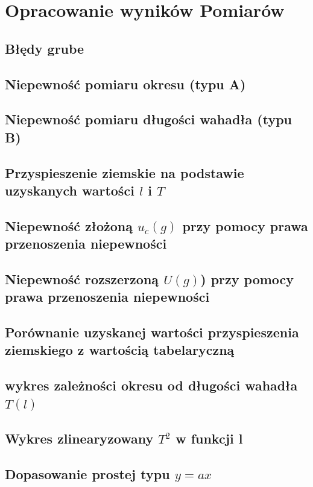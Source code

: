 \documentclass[18pt, twoside]{article}
\begin{document}
 
 
 
\section{Opracowanie wyników Pomiarów}
\subsection{Błędy grube}
\subsection{Niepewność pomiaru okresu (typu A)}
 \subsection{Niepewność pomiaru długości wahadła (typu B)}
 \subsection{Przyspieszenie ziemskie  na podstawie uzyskanych wartości \(l\) i \(T\)}
 \subsection{Niepewność złożoną \(u_c(g)\) przy pomocy prawa przenoszenia niepewności}
 \subsection{Niepewność rozszerzoną \(U(g)\)) przy pomocy prawa przenoszenia niepewności}
 \subsection{Porównanie uzyskanej wartości przyspieszenia ziemskiego z wartością tabelaryczną}
 \subsection{wykres zależności okresu od długości wahadła \(T(l)\)}
 \subsection{Wykres zlinearyzowany \(T^2\) w funkcji l}
 \subsection{Dopasowanie prostej typu \(y = ax\)}
\end{document}
